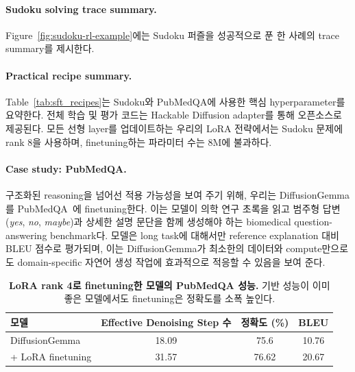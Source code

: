 \documentclass[11pt, a4paper, logo, copyright, gdm]{google}
\begin{document}
\paragraph{Sudoku solving trace summary.} Figure~\ref{fig:sudoku-rl-example}에는 Sudoku 퍼즐을 성공적으로 푼 한 사례의 trace summary를 제시한다.





\paragraph{Practical recipe summary.} Table~\ref{tab:sft_recipes}는 Sudoku와 PubMedQA에 사용한 핵심 hyperparameter를 요약한다. 전체 학습 및 평가 코드는 Hackable Diffusion adapter를 통해 오픈소스로 제공된다. 모든 선형 layer를 업데이트하는 우리의 LoRA 전략에서는 Sudoku 문제에 rank 8을 사용하며, finetuning하는 파라미터 수는 8M에 불과하다.

\paragraph{Case study: PubMedQA.} 구조화된 reasoning을 넘어선 적용 가능성을 보여 주기 위해, 우리는 DiffusionGemma를 PubMedQA~\citep{jin2019pubmedqa}에 finetuning한다. 이는 모델이 의학 연구 초록을 읽고 범주형 답변(\emph{yes}, \emph{no}, \emph{maybe})과 상세한 설명 문단을 함께 생성해야 하는 biomedical question-answering benchmark다. 모델은 long task에 대해서만 reference explanation 대비 BLEU 점수로 평가되며, 이는 DiffusionGemma가 최소한의 데이터와 compute만으로도 domain-specific 자연어 생성 작업에 효과적으로 적응할 수 있음을 보여 준다.



\begin{table}[H]
\centering
\begin{tabular}{lccc}
\toprule
모델 & Effective Denoising Step 수 & 정확도 (\%) & BLEU \\
\midrule
DiffusionGemma & 18.09 & 75.6 & 10.76 \\
+ LoRA finetuning & 31.57 & 76.62 & 20.67 \\
\bottomrule
\end{tabular}
\caption{\textbf{LoRA rank 4로 finetuning한 모델의 PubMedQA 성능.} 기반 성능이 이미 좋은 모델에서도 finetuning은 정확도를 소폭 높인다.}
\label{tab:pubmedqa_steps_vs_perf}
\end{table}
\end{document}

